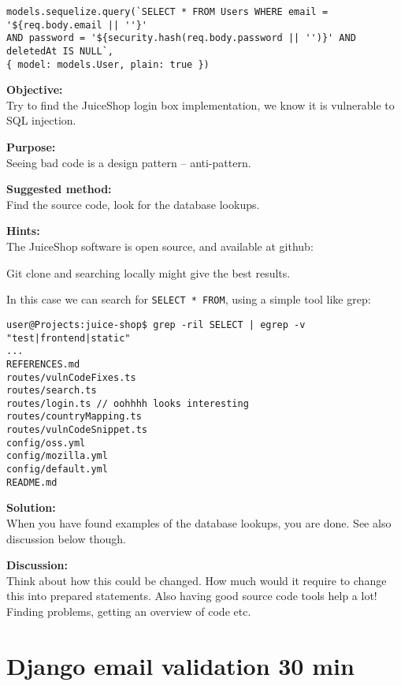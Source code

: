 \documentclass[a4paper,11pt,notitlepage]{report}
\begin{document}
\begin{verbatim}
models.sequelize.query(`SELECT * FROM Users WHERE email = '${req.body.email || ''}'
AND password = '${security.hash(req.body.password || '')}' AND deletedAt IS NULL`,
{ model: models.User, plain: true })
\end{verbatim}

{\bf Objective:}\\
Try to find the JuiceShop login box implementation, we know it is vulnerable to SQL injection.


{\bf Purpose:}\\
Seeing bad code is a design pattern -- anti-pattern.


{\bf Suggested method:}\\
Find the source code, look for the database lookups.


{\bf Hints:}\\
The JuiceShop software is open source, and available at github:\\

Git clone and searching locally might give the best results.

In this case we can search for \verb+SELECT * FROM+, using a simple tool like grep:

\begin{verbatim}
user@Projects:juice-shop$ grep -ril SELECT | egrep -v "test|frontend|static"
...
REFERENCES.md
routes/vulnCodeFixes.ts
routes/search.ts
routes/login.ts // oohhhh looks interesting
routes/countryMapping.ts
routes/vulnCodeSnippet.ts
config/oss.yml
config/mozilla.yml
config/default.yml
README.md
\end{verbatim}


{\bf Solution:}\\
When you have found examples of the database lookups, you are done. See also discussion below though.


{\bf Discussion:}\\
Think about how this could be changed. How much would it require to change this into prepared statements.
Also having good source code tools help a lot! Finding problems, getting an overview of code etc.



\chapter{Django email validation 30 min}
\label{ex:django-email}
\end{document}
